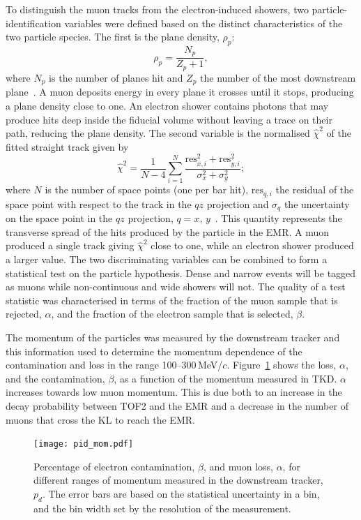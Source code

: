 To distinguish the muon tracks from the electron-induced showers,
two particle-identification variables were defined based on the
distinct characteristics of the two particle species.
The first is the plane density, $\rho_p$:
\begin{equation}
  \rho_p = \frac{N_p}{Z_p+1},
\end{equation}
where $N_p$ is the number of planes hit and $Z_p$ the number of the
most downstream plane~\cite{2015JInst..10P2012A}.
A muon deposits energy in every plane it crosses until it stops,
producing a plane density close to one.
An electron shower contains photons that may produce hits deep inside
the fiducial volume without leaving a trace on their path, reducing
the plane density.
The second variable is the normalised $\hat{\chi}^2$ of the fitted
straight track given by
\begin{equation}
  \hat{\chi}^2=\frac{1}{N-4}\sum_{i=1}^{N}\frac{\text{res}_{x,i}^2+\text{res}_{y,i}^2}{\sigma_x^2+\sigma_y^2};
\end{equation}
where $N$ is the number of space points (one per bar hit),
$\text{res}_{q,i}$ the residual of the space point with respect to the
track in the $qz$ projection and $\sigma_q$ the uncertainty on the
space point in the $qz$ projection, $q=x,\,y$~\cite{Drielsma:thesis}.
This quantity represents the transverse spread of the hits produced by
the particle in the EMR.
A muon produced a single track giving
$\hat{\chi}^2$ close to one, while an electron shower produced a larger value.
The two discriminating variables can be combined to form a statistical
test on the particle hypothesis. 
Dense and narrow events will be tagged as muons while non-continuous
and wide showers will not.  
The quality of a test statistic was characterised in terms of
the fraction of the muon sample that is rejected, $\alpha$, and the fraction of the electron sample that is selected, $\beta$.


The momentum of the particles was measured by the downstream tracker 
and this information used to determine the momentum dependence of the 
contamination and loss in the range 100--300\,MeV/$c$.
Figure~\ref{fig:emr_pid_mom} shows the loss, $\alpha$, and the
contamination, $\beta$, as a function of the momentum measured in
TKD.
$\alpha$ increases towards low muon momentum.
This is due both to an increase in the decay probability between TOF2
and the EMR and a decrease in the number of muons that cross the KL to
reach the EMR. 
\begin{figure}
  \begin{center}
    \texttt{[image: pid\_mom.pdf]}
  \end{center}
  \caption{
    Percentage of electron contamination, $\beta$, and muon loss,
    $\alpha$, for different ranges of momentum measured in the
    downstream tracker, $p_d$.
    The error bars are based on the statistical uncertainty in a bin,
    and the bin width set by the resolution of the measurement.
  }
  \label{fig:emr_pid_mom}
\end{figure}

